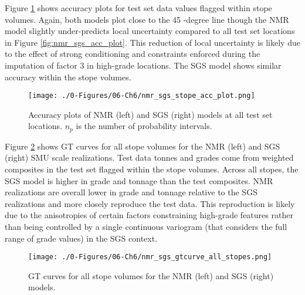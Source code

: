 Figure \ref{fig:nmr_sgs_stope_acc_plot} shows accuracy plots for test set data values flagged within stope volumes. Again, both models plot close to the 45 -degree line though the \gls{NMR} model slightly under-predicts local uncertainty compared to all test set locations in Figure \ref{fig:nmr_sgs_acc_plot}. This reduction of local uncertainty is likely due to the effect of strong conditioning and constraints enforced during the imputation of factor 3 in high-grade locations. The \gls{SGS} model shows similar accuracy within the stope volumes.

\begin{figure}[htb!]
    \centering
    \texttt{[image: ./0-Figures/06-Ch6/nmr\_sgs\_stope\_acc\_plot.png]}
    \caption{Accuracy plots of  \gls{NMR} (left) and \gls{SGS} (right) models at all test set locations. $n_{p}$ is the number of probability intervals. }
    \label{fig:nmr_sgs_stope_acc_plot}
\end{figure}

Figure \ref{fig:nmr_sgs_gtcurve_all_stopes} shows \gls{GT} curves for all stope volumes for the \gls{NMR} (left) and \gls{SGS} (right) \gls{SMU} scale realizations. Test data tonnes and grades come from weighted composites in the test set flagged within the stope volumes. Across all stopes, the \gls{SGS} model is higher in grade and tonnage than the test composites. \gls{NMR} realizations are overall lower in grade and tonnage relative to the \gls{SGS} realizations and more closely reproduce the test data. This reproduction is likely due to the anisotropies of certain factors constraining high-grade features rather than being controlled by a single continuous variogram (that considers the full range of grade values) in the \gls{SGS} context.

\begin{figure}[htb!]
    \centering
    \texttt{[image: ./0-Figures/06-Ch6/nmr\_sgs\_gtcurve\_all\_stopes.png]}
    \caption{\Gls{GT} curves for all stope volumes for the \gls{NMR} (left) and \gls{SGS} (right) models.}
    \label{fig:nmr_sgs_gtcurve_all_stopes}
\end{figure}

